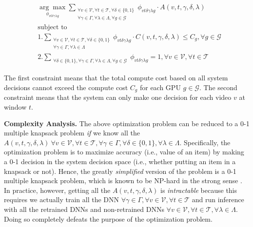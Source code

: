 \begin{equation}
    \begin{aligned}
       & \underset{\phi_{vt\delta\gamma\lambda g}}{\arg\max}
         \sum_{\substack{\forall v\in\mathcal{V}, 
                        \forall t\in\mathcal{T},
                        \forall \delta\in\{0,1\}\\
                        \forall \gamma\in\Gamma,
                        \forall \lambda\in\Lambda,
                        \forall g\in\mathcal{G}}} 
          \phi_{vt\delta\gamma\lambda g} \cdot
          A(v, t, \gamma, \delta, \lambda)\\
       & \text{subject to}\\
       & 1. \sum_{\substack{\forall v\in\mathcal{V}, 
                        \forall t\in\mathcal{T},
                        \forall \delta\in\{0,1\}\\
                        \forall \gamma\in\Gamma,
                        \forall \lambda\in\Lambda}}
                        \phi_{vt\delta\gamma\lambda g} \cdot
                        C(v, t, \gamma, \delta, \lambda)
                        \leq C_g, \forall g \in \mathcal{G} \\
      & 2. \sum_{\substack{\forall \delta\in\{0,1\},
                           \forall \gamma\in\Gamma, 
                           \forall \lambda\in\Lambda, 
                           \forall g\in\mathcal{G}}}
           \phi_{vt\delta\gamma\lambda g} = 1, 
           \forall v\in\mathcal{V}, 
           \forall t\in\mathcal{T}
    \end{aligned}
    \label{eqn:optimization}
\end{equation}

The first constraint means that the total compute cost based on all system decisions cannot exceed the compute cost $C_g$ for each GPU $g \in \mathcal{G}$. The second constraint means that the system can only make one decision for each video $v$ at window $t$.

\noindent\textbf{Complexity Analysis.} The above optimization problem can be reduced to a 0-1 multiple knapsack problem \emph{if} we know all the $A(v, t, \gamma, \delta, \lambda)\ \forall v \in \mathcal{V}, \forall t \in \mathcal{T}, \forall \gamma \in \Gamma, \forall \delta \in \{0,1\}, \forall \lambda \in \Lambda$. 
Specifically, the optimization problem is to maximize accuracy (i.e., value of an item) by making a 0-1 decision in the system decision space (i.e., whether putting an item in a knapsack or not). 
Hence, the greatly \emph{simplified} version of the problem is a 0-1 multiple knapsack problem, which is known to be NP-hard in the strong sense \cite{toth1990knapsack}. 
In practice, however, getting all the $A(v, t, \gamma, \delta, \lambda)$ is \emph{intractable} because this requires we actually train all the DNN $\forall \gamma\in\Gamma, \forall v \in \mathcal{V}, \forall t \in \mathcal{T}$ and run inference with all the retrained DNNs and non-retrained DNNs $\forall v \in \mathcal{V}, \forall t \in \mathcal{T}, \forall \lambda \in \Lambda$. 
Doing so completely defeats the purpose of the optimization problem.


